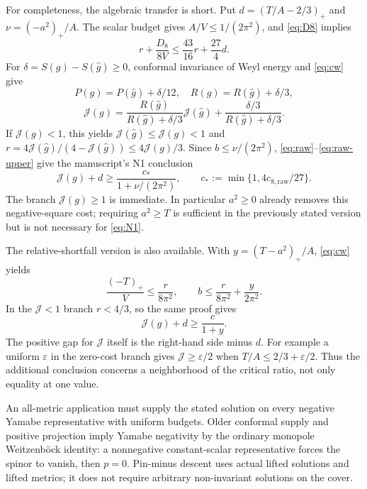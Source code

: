 \documentclass[11pt]{article}
\theoremstyle{remark}
\newcommand{\J}{\mathcal J}
\begin{document}
For completeness, the algebraic transfer is short. Put
$d=(T/A-2/3)_+$ and $\nu=(-a^2)_+/A$. The scalar budget gives
$A/V\le1/(2\pi^2)$, and \eqref{eq:D8} implies
\begin{equation}\label{eq:raw-upper}
 r+\frac{D_8}{8V}\le\frac{43}{16}r+\frac{27}{4}d.
\end{equation}
For $\delta=S(g)-S(\widehat g)\ge0$, conformal invariance of Weyl
energy and \eqref{eq:cw} give
\begin{equation}\label{eq:conformal}
 P(g)=P(\widehat g)+\delta/12,\quad
 R(g)=R(\widehat g)+\delta/3,
\end{equation}
\[
 \J(g)=\frac{R(\widehat g)}{R(\widehat g)+\delta/3}\J(\widehat g)
        +\frac{\delta/3}{R(\widehat g)+\delta/3}.
\]
If $\J(g)<1$, this yields $\J(\widehat g)\le\J(g)<1$ and
$r=4\J(\widehat g)/(4-\J(\widehat g))\le4\J(g)/3$.
Since $b\le\nu/(2\pi^2)$, \eqref{eq:raw}--\eqref{eq:raw-upper}
give the manuscript's N1 conclusion
\begin{equation}\label{eq:N1}
 \boxed{\J(g)+d\ge\frac{c_*}{1+\nu/(2\pi^2)},\qquad
 c_*:=\min\{1,4c_{8,\mathrm{raw}}/27\}.}
\end{equation}
The branch $\J(g)\ge1$ is immediate. In particular $a^2\ge0$
already removes this negative-square cost; requiring $a^2\ge T$ is
sufficient in the previously stated version but is not necessary for
\eqref{eq:N1}.

The relative-shortfall version is also available. With
$y=(T-a^2)_+/A$, \eqref{eq:cw} yields
\[
 \frac{(-T)_+}{V}\le\frac r{8\pi^2},\qquad
 b\le\frac r{8\pi^2}+\frac y{2\pi^2}.
\]
In the $\J<1$ branch $r<4/3$, so the same proof gives
\begin{equation}\label{eq:N1-y}
 \J(g)+d\ge\frac{c}{1+y}.
\end{equation}
The positive gap for $\J$ itself is the right-hand side minus $d$.
For example a uniform $\varepsilon$ in the zero-cost branch gives
$\J\ge\varepsilon/2$ when $T/A\le2/3+\varepsilon/2$.
Thus the additional conclusion concerns a neighborhood of the critical
ratio, not only equality at one value.

An all-metric application must supply the stated solution on every
negative Yamabe representative with uniform budgets. Older conformal
supply and positive projection imply Yamabe negativity by the ordinary
monopole Weitzenb\"ock identity: a nonnegative constant-scalar
representative forces the spinor to vanish, then $p=0$.
Pin-minus descent uses actual lifted solutions and lifted metrics; it
does not require arbitrary non-invariant solutions on the cover.
\end{document}

